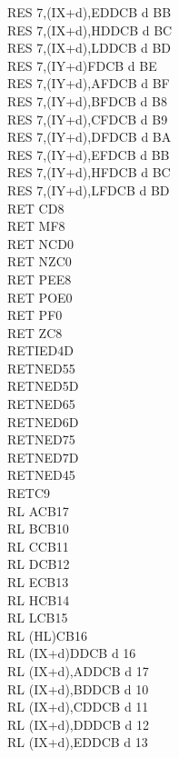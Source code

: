 \begin{multicols}{3}
{\begin{tabbing}
		RES 7,(IX+d),E\UNDOC\>DDCB d BB\\
		RES 7,(IX+d),H\UNDOC\>DDCB d BC\\
		RES 7,(IX+d),L\UNDOC\>DDCB d BD\\
		RES 7,(IY+d)\>FDCB d BE\\
		RES 7,(IY+d),A\UNDOC\>FDCB d BF\\
		RES 7,(IY+d),B\UNDOC\>FDCB d B8\\
		RES 7,(IY+d),C\UNDOC\>FDCB d B9\\
		RES 7,(IY+d),D\UNDOC\>FDCB d BA\\
		RES 7,(IY+d),E\UNDOC\>FDCB d BB\\
		RES 7,(IY+d),H\UNDOC\>FDCB d BC\\
		RES 7,(IY+d),L\UNDOC\>FDCB d BD\\
		RET C\>D8\\
		RET M\>F8\\
		RET NC\>D0\\
		RET NZ\>C0\\
		RET PE\>E8\\
		RET PO\>E0\\
		RET P\>F0\\
		RET Z\>C8\\
		RETI\>ED4D\\
		RETN\UNDOC\>ED55\\
		RETN\UNDOC\>ED5D\\
		RETN\UNDOC\>ED65\\
		RETN\UNDOC\>ED6D\\
		RETN\UNDOC\>ED75\\
		RETN\UNDOC\>ED7D\\
		RETN\>ED45\\
		RET\>C9\\
		RL A\>CB17\\
		RL B\>CB10\\
		RL C\>CB11\\
		RL D\>CB12\\
		RL E\>CB13\\
		RL H\>CB14\\
		RL L\>CB15\\
		RL (HL)\>CB16\\
		RL (IX+d)\>DDCB d 16\\
		RL (IX+d),A\UNDOC\>DDCB d 17\\
		RL (IX+d),B\UNDOC\>DDCB d 10\\
		RL (IX+d),C\UNDOC\>DDCB d 11\\
		RL (IX+d),D\UNDOC\>DDCB d 12\\
		RL (IX+d),E\UNDOC\>DDCB d 13\\

\end{tabbing}}
\end{multicols}
